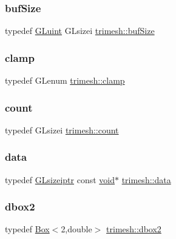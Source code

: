 \subsubsection{\texorpdfstring{buf\+Size}{bufSize}}
{\footnotesize\ttfamily typedef \hyperlink{namespacetrimesh_ad2289423ef47b393854afc30451d433b}{G\+Luint} G\+Lsizei \hyperlink{namespacetrimesh_aac63c9d1cb4d07a800743471ced428fc}{trimesh\+::buf\+Size}}

\mbox{\label{namespacetrimesh_add94ef6721eddee12fecac8a43c8a912}} 
\subsubsection{\texorpdfstring{clamp}{clamp}}
{\footnotesize\ttfamily typedef G\+Lenum \hyperlink{namespacetrimesh_add94ef6721eddee12fecac8a43c8a912}{trimesh\+::clamp}}

\mbox{\label{namespacetrimesh_ac13d44425d3b59f77b5d7d2917514052}} 
\subsubsection{\texorpdfstring{count}{count}}
{\footnotesize\ttfamily typedef G\+Lsizei \hyperlink{namespacetrimesh_ac13d44425d3b59f77b5d7d2917514052}{trimesh\+::count}}

\mbox{\label{namespacetrimesh_ad9c3b218c6c8bf976dbcd9afb8740bb8}} 
\subsubsection{\texorpdfstring{data}{data}}
{\footnotesize\ttfamily typedef \hyperlink{namespacetrimesh_a81f1ae6b94117df73fad0a5577fd01a9}{G\+Lsizeiptr} const \hyperlink{namespacetrimesh_a784ddfd979e1c579bda795a8edfc3f43}{void}$\ast$ \hyperlink{namespacetrimesh_ad9c3b218c6c8bf976dbcd9afb8740bb8}{trimesh\+::data}}

\mbox{\label{namespacetrimesh_a946f3fa465346c3a1cc575b5b1acd90b}} 
\subsubsection{\texorpdfstring{dbox2}{dbox2}}
{\footnotesize\ttfamily typedef \hyperlink{classtrimesh_1_1Box}{Box}$<$2,double$>$ \hyperlink{namespacetrimesh_a946f3fa465346c3a1cc575b5b1acd90b}{trimesh\+::dbox2}}

